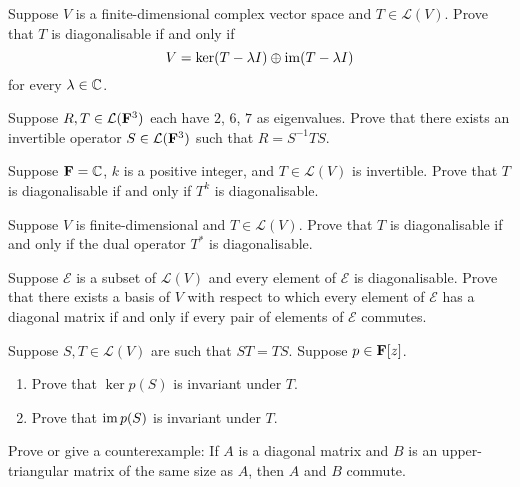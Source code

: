 \begin{exercise}
Suppose $V$ is a finite-dimensional complex vector space and $T\in\mathcal{L}(V)$. Prove that $T$ is diagonalisable if and only if
\[V=\ker(T-\lambda I)\oplus\operatorname{im}(T-\lambda I)\]
for every $\lambda\in\mathbb C$.
\end{exercise}

\begin{exercise}
Suppose $R,T\in\mathcal{L}(\mathbf F^3)$ each have $2$, $6$, $7$ as eigenvalues. Prove that there exists an invertible operator $S\in\mathcal{L}(\mathbf F^3)$ such that $R=S^{-1}TS$.
\end{exercise}

\begin{exercise}
Suppose $\mathbf F=\mathbb C$, $k$ is a positive integer, and $T\in\mathcal{L}(V)$ is invertible. Prove that $T$ is diagonalisable if and only if $T^k$ is diagonalisable.
\end{exercise}

\begin{exercise}
Suppose $V$ is finite-dimensional and $T\in\mathcal{L}(V)$. Prove that $T$ is diagonalisable if and only if the dual operator $T^*$ is diagonalisable.
\end{exercise}

\begin{exercise}
Suppose $\mathcal{E}$ is a subset of $\mathcal{L}(V)$ and every element of $\mathcal{E}$ is diagonalisable. Prove that there exists a basis of $V$ with respect to which every element of $\mathcal{E}$ has a diagonal matrix if and only if every pair of elements of $\mathcal{E}$ commutes.
\end{exercise}

\begin{exercise}
Suppose $S,T\in\mathcal{L}(V)$ are such that $ST=TS$. Suppose $p\in\mathbf F[z]$.
\begin{enumerate}[label=(\roman*)]
\item Prove that $\ker p(S)$ is invariant under $T$.
\item Prove that $\operatorname{im} p(S)$ is invariant under $T$.
\end{enumerate}
\end{exercise}

\begin{exercise}
Prove or give a counterexample: If $A$ is a diagonal matrix and $B$ is an upper-triangular matrix of the same size as $A$, then $A$ and $B$ commute.
\end{exercise}

